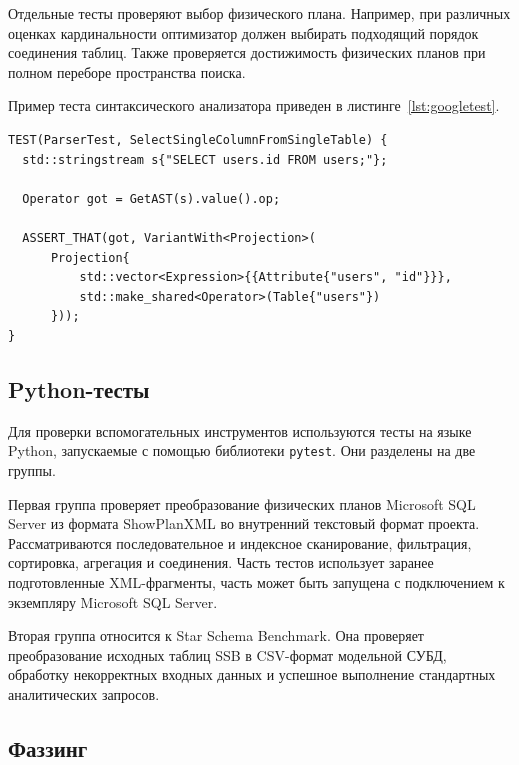 \documentclass[fontsize=14pt, russian]{scrartcl}
\begin{document}
Отдельные тесты проверяют выбор физического плана. Например, при различных
оценках кардинальности оптимизатор должен выбирать подходящий порядок соединения
таблиц. Также проверяется достижимость физических планов при полном переборе
пространства поиска.

Пример теста синтаксического анализатора приведен в
листинге~\ref{lst:googletest}.

\begin{listing}[H]
  \caption{Пример модульного теста.}
  \label{lst:googletest}
  \begin{verbatim}
TEST(ParserTest, SelectSingleColumnFromSingleTable) {
  std::stringstream s{"SELECT users.id FROM users;"};

  Operator got = GetAST(s).value().op;

  ASSERT_THAT(got, VariantWith<Projection>(
      Projection{
          std::vector<Expression>{{Attribute{"users", "id"}}},
          std::make_shared<Operator>(Table{"users"})
      }));
}
  \end{verbatim}
\end{listing}

\subsection{Python-тесты}

Для проверки вспомогательных инструментов используются тесты на языке Python,
запускаемые с помощью библиотеки \verb|pytest|. Они разделены на две группы.

Первая группа проверяет преобразование физических планов Microsoft SQL Server из
формата ShowPlanXML во внутренний текстовый формат проекта. Рассматриваются
последовательное и индексное сканирование, фильтрация, сортировка, агрегация и
соединения. Часть тестов использует заранее подготовленные XML-фрагменты, часть
может быть запущена с подключением к экземпляру Microsoft SQL Server.

Вторая группа относится к Star Schema Benchmark. Она проверяет преобразование
исходных таблиц SSB в CSV-формат модельной СУБД, обработку некорректных входных
данных и успешное выполнение стандартных аналитических запросов.

\subsection{Фаззинг}
\end{document}
